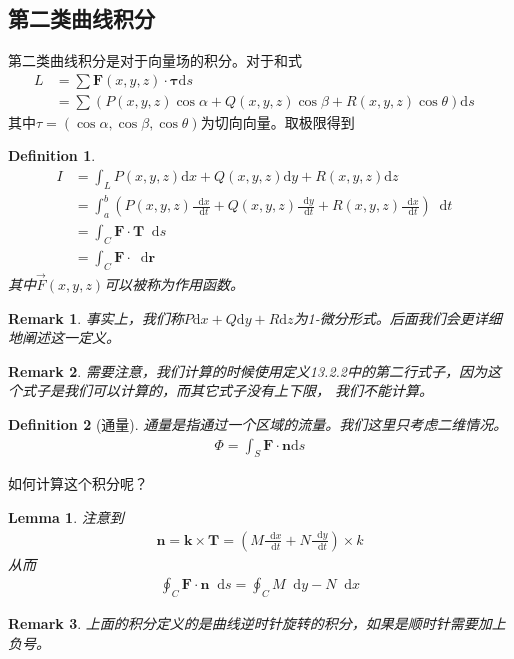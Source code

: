 \documentclass[12pt,a4paper,UTF8]{ctexbook}
\theoremstyle{plain}
\newtheorem{lemma}[theorem]{\indent Lemma}
\newtheorem{definition}{\indent Definition}[section]
\newtheorem{remark}{\indent Remark}[section]
\newcommand{\diff}{\mathop{}\!\mathrm{d}} %
\newcommand{\vb}[1]{\mathbf{#1}}          %
\begin{document}
\subsection{第二类曲线积分}
第二类曲线积分是对于向量场的积分。对于和式
\begin{align*}
    L&=\sum \vb{F}(x,y,z)\cdot \vb{\tau}\mathrm d s&\\
     &=\sum (P(x,y,z)\cos \alpha+Q(x,y,z)\cos \beta+R(x,y,z)\cos \theta)\mathrm d s&
\end{align*}
其中$\tau=(\cos \alpha,\cos \beta, \cos \theta)$为切向向量。取极限得到
\begin{definition}
\begin{align*}
    I&=\int_{L} P(x,y,z)\mathrm d x+Q(x,y,z)\mathrm d y +R(x,y,z)\mathrm d z&\\
    &=\int_{a}^{b}(P(x,y,z)\frac{\diff x}{\diff t}+Q(x,y,z) \frac{\diff y}{\diff t} +R(x,y,z) \frac{\diff x}{\diff t})\diff t&\\
    &=\int_C \vb{F}\cdot \vb{T}\diff s&\\
    &=\int_C \vb{F}\cdot \diff \vb{r}&
\end{align*}
其中$\vec F(x,y,z)$可以被称为作用函数。

\end{definition}
\begin{remark}
事实上，我们称$P\mathrm d x+Q\mathrm d y +R\mathrm d z$为1-微分形式。后面我们会更详细
地阐述这一定义。
\end{remark}
\begin{remark} 
    需要注意，我们计算的时候使用定义13.2.2中的第二行式子，因为这个式子是我们可以计算的，而其它式子没有上下限，
    我们不能计算。
\end{remark}
\begin{definition}[通量]
    通量是指通过一个区域的流量。我们这里只考虑二维情况。
    \begin{align*}
        \Phi=\int_{S}\vb{F}\cdot \vb{n}\mathrm d s
    \end{align*}
\end{definition}
如何计算这个积分呢？
\begin{lemma}
    注意到 
    \begin{align*} 
        \vb{n} = \vb{k}\times \vb{T} = (M\frac{\diff x}{\diff t}+N\frac{\diff y}{\diff t})\times k
    \end{align*}
    从而
    \begin{align*} 
        \oint_C \vb{F}\cdot \vb{n}\diff s = \oint_C M\diff y-N\diff x
    \end{align*}
\end{lemma}
\begin{remark}
    上面的积分定义的是曲线逆时针旋转的积分，如果是顺时针需要加上负号。
\end{remark}
\end{document}
